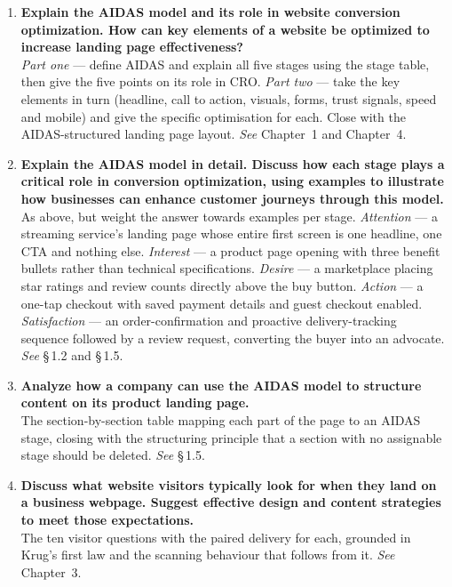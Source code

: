 \begin{enumerate}[leftmargin=2.2em,itemsep=1.4ex]

\item \textbf{Explain the AIDAS model and its role in website conversion
      optimization. How can key elements of a website be optimized to increase
      landing page effectiveness?} \\
      \emph{Part one} --- define AIDAS and explain all five stages using the
      stage table, then give the five points on its role in CRO.
      \emph{Part two} --- take the key elements in turn (headline, call to action,
      visuals, forms, trust signals, speed and mobile) and give the specific
      optimisation for each. Close with the AIDAS-structured landing page layout.
      \hfill\emph{See} Chapter~1 and Chapter~4.

\item \textbf{Explain the AIDAS model in detail. Discuss how each stage plays a
      critical role in conversion optimization, using examples to illustrate how
      businesses can enhance customer journeys through this model.}
      \\
      As above, but weight the answer towards examples per stage.
      \emph{Attention} --- a streaming service's landing page whose entire first
      screen is one headline, one CTA and nothing else. \emph{Interest} --- a
      product page opening with three benefit bullets rather than technical
      specifications. \emph{Desire} --- a marketplace placing star ratings and
      review counts directly above the buy button. \emph{Action} --- a one-tap
      checkout with saved payment details and guest checkout enabled.
      \emph{Satisfaction} --- an order-confirmation and proactive
      delivery-tracking sequence followed by a review request, converting the
      buyer into an advocate. \hfill\emph{See} \S\,1.2 and \S\,1.5.

\item \textbf{Analyze how a company can use the AIDAS model to structure content
      on its product landing page.} \\
      The section-by-section table mapping each part of the page to an AIDAS
      stage, closing with the structuring principle that a section with no
      assignable stage should be deleted. \hfill\emph{See} \S\,1.5.

\item \textbf{Discuss what website visitors typically look for when they land on a
      business webpage. Suggest effective design and content strategies to meet
      those expectations.} \\
      The ten visitor questions with the paired delivery for each, grounded in
      Krug's first law and the scanning behaviour that follows from it.
      \hfill\emph{See} Chapter~3.


\end{enumerate}
